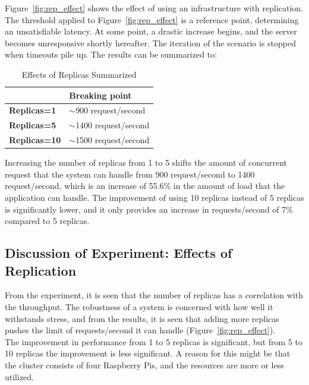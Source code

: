 \noindent Figure~\ref{fig:rep_effect} shows the effect of using an infrastructure with replication. The threshold applied to Figure~\ref{fig:rep_effect} is a reference point, determining an unsatisfiable latency. At some point, a drastic increase begins, and the server becomes unresponsive shortly hereafter. The iteration of the scenario is stopped when timeouts pile up. The results can be summarized to:
\begin{table}[]
\centering

\begin{tabular}{|l|l|}
\hline
\rowcolor[HTML]{EFEFEF} 
                     & \textbf{Breaking point}   \\ \hline
\textbf{Replicas=1}  & $\sim$900 request/second  \\ \hline
\textbf{Replicas=5}  & $\sim$1400 request/second \\ \hline
\textbf{Replicas=10} & $\sim$1500 request/second \\ \hline
\end{tabular}
\caption{Effects of Replicas Summarized}
\label{table:effects_replicas}
\end{table}

\noindent Increasing the number of replicas from 1 to 5 shifts the amount of concurrent request that the system can handle from 900 request/second to 1400 request/second, which is an increase of 55.6\% in the amount of load that the application can handle. The improvement of using 10 replicas instead of 5 replicas is significantly lower, and it only provides an increase in requests/second of 7\% compared to 5 replicas.
 
 
\subsection*{Discussion of Experiment: Effects of Replication}
From the experiment, it is seen that the number of replicas has a correlation with the throughput. The robustness of a system is concerned with how well it withstands stress, and from the results, it is seen that adding more replicas pushes the limit of requests/second it can handle (Figure~\ref{fig:rep_effect}). \\

\noindent
The improvement in performance from 1 to 5 replicas is significant, but from 5 to 10 replicas the improvement is less significant. A reason for this might be that the cluster consists of four Raspberry Pis, and the resources are more or less utilized.

